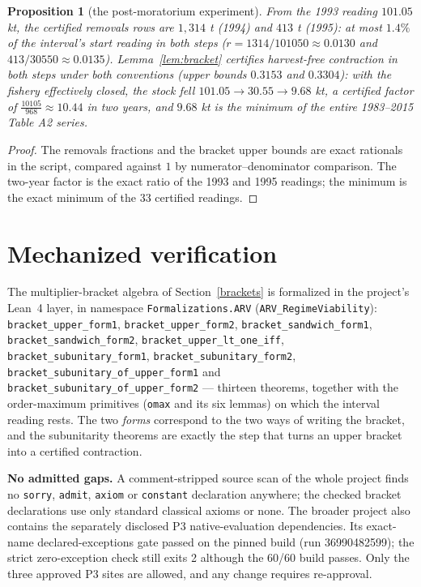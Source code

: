 \documentclass[10pt,twocolumn]{article}
\theoremstyle{plain}
\newtheorem{proposition}[theorem]{Proposition}
\theoremstyle{remark}
\begin{document}
\begin{proposition}[the post-moratorium experiment]
\label{prop:experiment}
From the 1993 reading \(101.05\) kt, the certified removals rows are
\(1{,}314\) t (1994) and \(413\) t (1995): at most \(1.4\%\) of the
interval's start reading in both steps (\(r = 1314/101050 \approx
0.0130\) and \(413/30550 \approx 0.0135\)). Lemma~\ref{lem:bracket}
certifies harvest-free contraction in both steps under both conventions
(upper bounds \(0.3153\) and \(0.3304\)): with the fishery effectively
closed, the stock fell \(101.05 \to 30.55 \to 9.68\) kt, a certified
factor of \(\tfrac{10105}{968} \approx 10.44\) in two years, and
\(9.68\) kt is the minimum of the entire 1983--2015 Table A2 series.
\end{proposition}

\begin{proof}
The removals fractions and the bracket upper bounds are exact
rationals in the script, compared against \(1\) by
numerator--denominator comparison. The two-year factor is the exact
ratio of the 1993 and 1995 readings; the minimum is the exact minimum
of the 33 certified readings.
\end{proof}

\section{Mechanized verification}
\label{mech}

The multiplier-bracket algebra of Section~\ref{brackets} is formalized in the project's
Lean~4 layer, in namespace \texttt{Formalizations.ARV} (\texttt{ARV\_RegimeViability}):
\texttt{bracket\_upper\_form1}, \texttt{bracket\_upper\_form2},
\texttt{bracket\_sandwich\_form1}, \texttt{bracket\_sandwich\_form2},
\texttt{bracket\_upper\_lt\_one\_iff}, \texttt{bracket\_subunitary\_form1},
\texttt{bracket\_subunitary\_form2}, \texttt{bracket\_subunitary\_of\_upper\_form1} and
\texttt{bracket\_subunitary\_of\_upper\_form2} --- thirteen theorems, together with the
order-maximum primitives (\texttt{omax} and its six lemmas) on which the interval reading
rests. The two \emph{forms} correspond to the two ways of writing the bracket, and the
subunitarity theorems are exactly the step that turns an upper bracket into a certified
contraction.

\noindent\textbf{No admitted gaps.} A comment-stripped source scan of the whole project finds
no \texttt{sorry}, \texttt{admit}, \texttt{axiom} or \texttt{constant} declaration anywhere;
the checked bracket declarations use only standard classical axioms or none.
The broader project also contains the separately disclosed P3 native-evaluation dependencies. Its exact-name declared-exceptions gate passed on the pinned build (run 36990482599); the strict zero-exception check still exits 2 although the 60/60 build passes. Only the three approved P3 sites are allowed, and any change requires re-approval.
\end{document}
